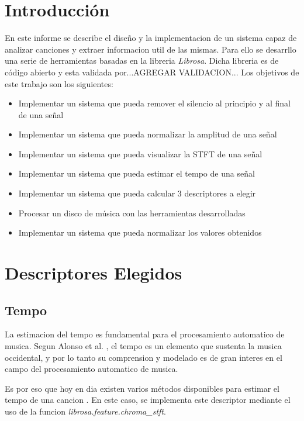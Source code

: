 \documentclass[]{article}
\begin{document}
\begin{multicols}{2}
\section{Introducción}
\label{sec: intro}
En este informe se describe el diseño y la implementacion de un sistema capaz de
analizar canciones y extraer informacion util de las mismas. Para ello se desarrllo
una serie de herramientas basadas en la libreria \textit{Librosa}. Dicha libreria
es de código abierto y esta validada por...AGREGAR VALIDACION...
\lipsum[2]
\lipsum[3]
Los objetivos de este trabajo son los siguientes:
\begin{itemize}
  \item Implementar un sistema que pueda remover el silencio al principio y al final de una señal
  \item Implementar un sistema que pueda normalizar la amplitud de una señal
  \item Implementar un sistema que pueda visualizar la STFT de una señal
  \item Implementar un sistema que pueda estimar el tempo de una señal
  \item Implementar un sistema que pueda calcular 3 descriptores a elegir
  \item Procesar un disco de música con las herramientas desarrolladas
  \item Implementar un sistema que pueda normalizar los valores obtenidos
\end{itemize}

\section{Descriptores Elegidos}

\subsection{Tempo}
La estimacion del tempo es fundamental para el procesamiento automatico de musica.
Segun Alonso et al. \cite{alonso2004tempo}, el tempo es un elemento que sustenta
la musica occidental, y por lo tanto su comprension y modelado es de gran interes
en el campo del procesamiento automatico de musica.

Es por eso que hoy en dia existen varios métodos disponibles para estimar el tempo
de una cancion \cite{goto1997issues}. En este caso, se implementa este descriptor
mediante el uso de la funcion \emph{{librosa.feature.chroma\_stft}}.

\end{multicols}
\end{document}
